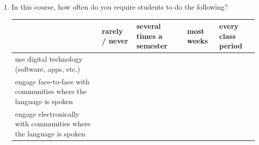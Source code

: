 \documentclass[letterpaper,10pt]{article}
\begin{document}
\begin{enumerate}
\item In this course, how often do you require students to do the following?\\[0.05in]

\renewcommand{\arraystretch}{1.5}
\begin{tabular}{|p{2.2in}|p{0.8in}|p{0.9in}|p{0.8in}|p{0.8in}|}
\hline
 & rarely / never & several times a semester & most weeks & every class period \\
\hline
use digital technology (software, apps, etc.) & & & & \\
\hline
engage face-to-face with communities where the language is spoken & & & & \\
\hline
engage electronically with communities where the language is spoken & & & & \\
\hline
\end{tabular}

\end{enumerate}
\newpage
{}
\end{document}
